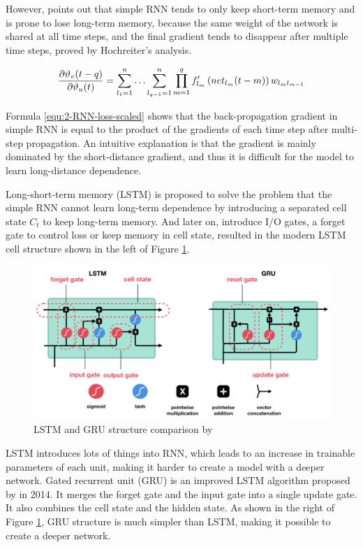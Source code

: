 However, \citet{hochreiter1997long} points out that simple RNN tends to only keep short-term memory and is prone to lose long-term memory, because the same weight of the network is shared at all time steps, and the final gradient tends to disappear after multiple time steps, proved by Hochreiter's analysis.

\begin{equation}
    \frac{\partial \vartheta_{v}(t-q)}{\partial \vartheta_{u}(t)}=\sum_{l_{1}=1}^{n} \ldots \sum_{l_{q-1}=1}^{n} \prod_{m=1}^{q} f_{l_{m}}^{\prime}\left(n e t_{l_{m}}(t-m)\right) w_{l_{m} l_{m-1}}
    \eqcite{hochreiter1997long}
    \label{equ:2-RNN-loss-scaled}
\end{equation}

Formula \ref{equ:2-RNN-loss-scaled} shows that the back-propagation gradient in simple RNN is equal to the product of the gradients of each time step after multi-step propagation.
An intuitive explanation is that the gradient is mainly dominated by the short-distance gradient, and thus it is difficult for the model to learn long-distance dependence.

Long-short-term memory (LSTM) is proposed to solve the problem that the simple RNN cannot learn long-term dependence by introducing a separated cell state $C_t$ to keep long-term memory. And later on, \citet{Gers2000LearningTF} introduce I/O gates, a forget gate to control loss or keep memory in cell state, resulted in the modern LSTM cell structure shown in the left of Figure \ref{fig:ext-LSTM-GRU}.

\begin{figure}[ht!]
    \centering
    \includegraphics[width=.9\textwidth]{literature/imgs/ext-LSTM-GRU.png}
    \caption{LSTM and GRU structure comparison by \citet{phi2018illustrated}}
    \label{fig:ext-LSTM-GRU}
\end{figure}

LSTM introduces lots of things into RNN, which leads to an increase in trainable parameters of each unit, making it harder to create a model with a deeper network.
Gated recurrent unit (GRU) is an improved LSTM algorithm proposed by \citet{chung2014empirical} in 2014. It merges the forget gate and the input gate into a single update gate. It also combines the cell state and the hidden state.
As shown in the right of Figure \ref{fig:ext-LSTM-GRU}, GRU structure is much simpler than LSTM, making it possible to create a deeper network.


